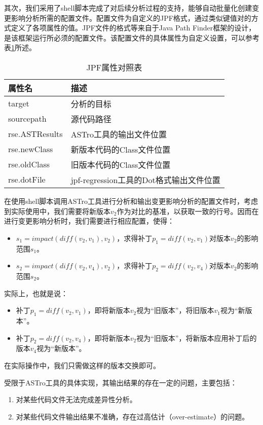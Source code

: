 其次，我们采用了shell脚本完成了对后续分析过程的支持，能够自动批量化创建变更影响分析所需的配置文件。配置文件为自定义的JPF格式，通过类似键值对的方式定义了各项属性的值。JPF文件的格式等来自于Java Path Finder框架的设计，是该框架运行所必须的配置文件。该配置文件的具体属性为自定义设置，可以参考表\ref {JPF_prop}所述。

\begin{table}
	\caption{JPF属性对照表}
	\label{JPF_prop}
	\centering
	    \begin{tabular*}{\linewidth}{lp{10cm}}
	    	\toprule[1.5pt]
	    	{\heiti 属性名} & {\heiti 描述} \\\midrule[1pt]
	    	target & 分析的目标 \\
	    	sourcepath & 源代码路径\\
	    	rse.ASTResults & ASTro工具的输出文件位置\\
	    	rse.newClass & 新版本代码的Class文件位置\\
	    	rse.oldClass    & 旧版本代码的Class文件位置\\
	    	rse.dotFile   & jpf-regression工具的Dot格式输出文件位置\\
	    	\bottomrule[1.5pt]
	    \end{tabular*}
\end{table}

在使用shell脚本调用ASTro工具进行分析和输出变更影响分析的配置文件时，考虑到实际使用中，我们需要将新版本$v_2$作为对比的基准，以获取一致的行号。因而在进行变更影响分析时，我们需要进行相应配置，使得：
\begin{itemize}
	\item $s_1 = impact(diff(v_2,v_1),v_2)$，求得补丁$p_1 = diff(v_2,v_1)$对版本$v_2$的影响范围$s_1$。
	\item $s_2 = impact(diff(v_2,v_4),v_2)$，求得补丁$p_2 = diff(v_2,v_4)$对版本$v_2$的影响范围$s_2$。
\end{itemize}

实际上，也就是说：
\begin{itemize}
	\item 补丁$p_1 = diff(v_2,v_1)$，即将新版本$v_2$视为“旧版本”，将旧版本$v_1$视为“新版本”。
	\item 补丁$p_2 = diff(v_2,v_4)$，即将新版本$v_2$视为“旧版本”，将新版本应用补丁后的版本$v_4$视为“新版本”。
\end{itemize}

在实际操作中，我们只需做这样的版本交换即可。

受限于ASTro工具的具体实现，其输出结果的存在一定的问题，主要包括：
\begin{enumerate}
	\item 对某些代码文件无法完成差异性分析。
	\item 对某些代码文件输出结果不准确，存在过高估计（over-estimate）的问题。
\end{enumerate}

